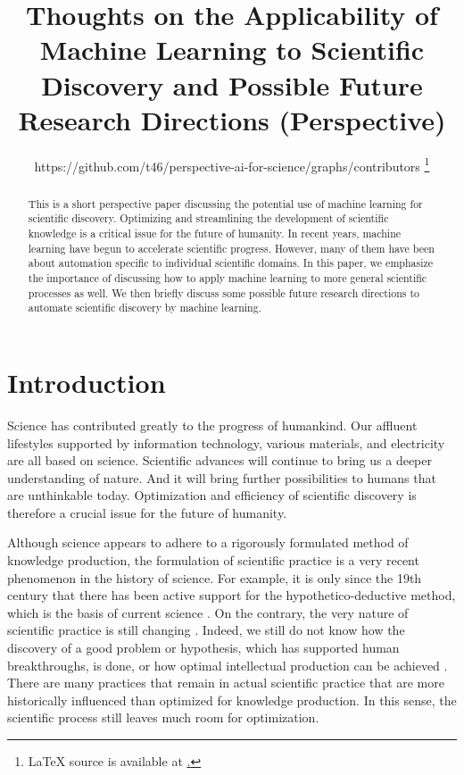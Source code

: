 \documentclass{article}
\title{Thoughts on the Applicability of Machine Learning to Scientific Discovery and Possible Future Research Directions (Perspective)}
\author{%
https://github.com/t46/perspective-ai-for-science/graphs/contributors
\thanks{
  LaTeX source is available at 
  \href{https://github.com/t46/perspective-ai-for-science}.
  }
}
\begin{document}
\maketitle

\begin{abstract}
 This is a short perspective paper discussing the potential use of machine learning for scientific discovery. Optimizing and streamlining the development of scientific knowledge is a critical issue for the future of humanity. In recent years, machine learning have begun to accelerate scientific progress. However, many of them have been about automation specific to individual scientific domains. In this paper, we emphasize the importance of discussing how to apply machine learning to more general scientific processes as well. We then briefly discuss some possible future research directions to automate scientific discovery by machine learning.
\end{abstract}

\section{Introduction}
Science has contributed greatly to the progress of humankind. Our affluent lifestyles supported by information technology, various materials, and electricity are all based on science. Scientific advances will continue to bring us a deeper understanding of nature. And it will bring further possibilities to humans that are unthinkable today. Optimization and efficiency of scientific discovery is therefore a crucial issue for the future of humanity.

Although science appears to adhere to a rigorously formulated method of knowledge production, the formulation of scientific practice is a very recent phenomenon in the history of science. For example, it is only since the 19th century that there has been active support for the hypothetico-deductive method, which is the basis of current science \cite{sankey2014}. On the contrary, the very nature of scientific practice is still changing \cite{hey2009fourth}. Indeed, we still do not know how the discovery of a good problem or hypothesis, which has supported human breakthroughs, is done, or how optimal intellectual production can be achieved \cite{scientificdiscovery}. There are many practices that remain in actual scientific practice that are more historically influenced than optimized for knowledge production. In this sense, the scientific process still leaves much room for optimization.
\end{document}

